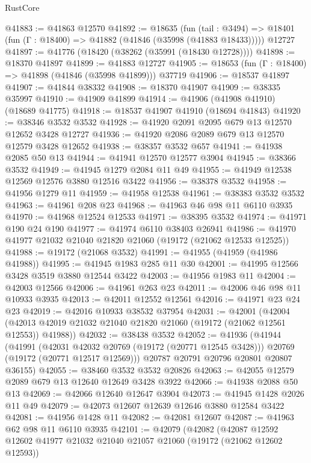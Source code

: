 \begin{lexlean}{RustCore}
\begin{coremodule}
@41883 := @41863 @12570
@41892 := @18635
    (fun (tail : @3494) => @18401 (fun (Γ : @18400) => @41882 (@41846 (@35998 (@41883 @18433)))))
    @12727
@41897 := @41776 (@18420 (@38262 (@35991 (@18430 @12728))))
@41898 := @18370 @41897
@41899 := @41883 @12727
@41905 := @18653 (fun (Γ : @18400) => @41898 (@41846 (@35998 @41899))) @37719
@41906 := @18537 @41897
@41907 := @41844 @38332
@41908 := @18370 @41907
@41909 := @38335 @35997
@41910 := @41909 @41899
@41914 := @41906 (@41908 @41910) (@18689 @41775)
@41918 := @18537 @41907 @41910 (@18694 @41843)
@41920 := @38346 @3532 @3532
@41928 := @41920 @2091 @2095 @679 @13 @12570 @12652 @3428 @12727
@41936 := @41920 @2086 @2089 @679 @13 @12570 @12579 @3428 @12652
@41938 := @38357 @3532 @657
@41941 := @41938 @2085 @50 @13
@41944 := @41941 @12570 @12577 @3904
@41945 := @38366 @3532
@41949 := @41945 @1279 @2084 @11 @49
@41955 := @41949 @12538 @12569 @12576 @3880 @12516 @3422
@41956 := @38378 @3532
@41958 := @41956 @1279 @11
@41959 := @41958 @12538
@41961 := @38383 @3532 @3532
@41963 := @41961 @208 @23
@41968 := @41963 @46 @98 @11 @6110 @3935
@41970 := @41968 @12524 @12533
@41971 := @38395 @3532
@41974 := @41971 @190 @24 @190
@41977 := @41974 @6110 @38403 @26941
@41986 := @41970 @41977 @21032 @21040 @21820 @21060 (@19172 (@21062 @12533 @12525))
@41988 := @19172 (@21068 @3532)
@41991 := @41955 (@41959 (@41986 @41988))
@41995 := @41945 @1983 @285 @11 @30
@42001 := @41995 @12566 @3428 @3519 @3880 @12544 @3422
@42003 := @41956 @1983 @11
@42004 := @42003 @12566
@42006 := @41961 @263 @23
@42011 := @42006 @46 @98 @11 @10933 @3935
@42013 := @42011 @12552 @12561
@42016 := @41971 @23 @24 @23
@42019 := @42016 @10933 @38532 @37954
@42031 := @42001
    (@42004 (@42013 @42019 @21032 @21040 @21820 @21060 (@19172 (@21062 @12561 @12553)) @41988))
@42032 := @38438 @3532
@42052 := @41936
    (@41944
      (@41991
        (@42031 @42032 @20769 (@19172 (@20771 @12545 @3428)))
        @20769
        (@19172 (@20771 @12517 @12569)))
      @20787
      @20791
      @20796
      @20801
      @20807
      @36155)
@42055 := @38460 @3532 @3532 @20826
@42063 := @42055 @12579 @2089 @679 @13 @12640 @12649 @3428 @3922
@42066 := @41938 @2088 @50 @13
@42069 := @42066 @12640 @12647 @3904
@42073 := @41945 @1428 @2026 @11 @49
@42079 := @42073 @12607 @12639 @12646 @3880 @12584 @3422
@42081 := @41956 @1428 @11
@42082 := @42081 @12607
@42087 := @41963 @62 @98 @11 @6110 @3935
@42101 := @42079
    (@42082
      (@42087
        @12592
        @12602
        @41977
        @21032
        @21040
        @21057
        @21060
        (@19172 (@21062 @12602 @12593))

\end{coremodule}
\end{lexlean}
